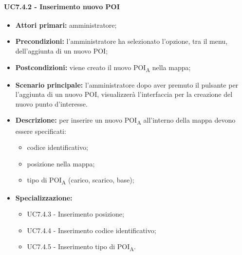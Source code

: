 \paragraph{UC7.4.2 - Inserimento nuovo POI}

\begin{itemize}
	\item 	\textbf{Attori primari:} amministratore;
	\item 	\textbf{Precondizioni:} l'amministratore ha selezionato l'opzione, tra il menu, dell'aggiunta di un nuovo POI;
	\item 	\textbf{Postcondizioni:} viene creato il nuovo \acrshort{POI}\textsubscript{A} nella mappa;
	\item 	\textbf{Scenario principale:} l'amministratore dopo aver premuto il pulsante per l'aggiunta di un nuovo POI, visualizzerà l'interfaccia per la creazione del nuovo punto d'interesse. 
	\item 	\textbf{Descrizione:} per inserire un nuovo \acrshort{POI}\textsubscript{A} all'interno della mappa devono essere specificati:
	\begin{itemize}
		\item codice identificativo;
		\item posizione nella mappa;
		\item tipo di \acrshort{POI}\textsubscript{A} (carico, scarico, base);
	\end{itemize}
	\item 	\textbf{Specializzazione:}
	\begin{itemize}
		\item UC7.4.3 - Inserimento posizione;
		\item UC7.4.4 - Inserimento codice identificativo;
		\item UC7.4.5 - Inserimento tipo di \acrshort{POI}\textsubscript{A}.
	\end{itemize}
\end{itemize}

